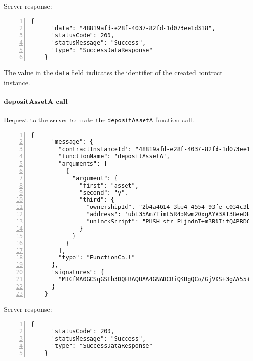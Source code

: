 Server response:
{
  \small
  \begin{Verbatim}[numbers=left,xleftmargin=1cm,firstnumber=1,breaklines=true,breakanywhere=true,tabsize=2]
    {
      "data": "48819afd-e28f-4037-82fd-1d073ee1d318",
      "statusCode": 200,
      "statusMessage": "Success",
      "type": "SuccessDataResponse"
    }
  \end{Verbatim}
}

The value in the \verb|data| field indicates the identifier of the created contract instance.

\paragraph{depositAssetA call}

Request to the server to make the \verb|depositAssetA| function call:
{
  \small
  \begin{Verbatim}[numbers=left,xleftmargin=1cm,firstnumber=1,breaklines=true,breakanywhere=true,tabsize=2]
    {
      "message": {
        "contractInstanceId": "48819afd-e28f-4037-82fd-1d073ee1d318",
        "functionName": "depositAssetA",
        "arguments": [
          {
            "argument": {
              "first": "asset",
              "second": "y",
              "third": {
                "ownershipId": "2b4a4614-3bb4-4554-93fe-c034c3ba5a9c",
                "address": "ubL35Am7TimL5R4oMwm2OxgAYA3XT3BeeDE56oxqdLc=",
                "unlockScript": "PUSH str PLjodnT+m3RNIitQAPBDCsRmJPHCqrwZOY/CPiHFZGnl+DRN6soqxMy3ehTFaUwxBjjf7qfBfvTDq5oBItTFrtz1Rn5SDS1ybdbkwpKaOXVglNOw7ZEG9bbZ1mo1oA7IAjRiIilzUetCstE5rPZIf9XOXr/RQ5AHkZUn2CztsvA=\nPUSH str MIGfMA0GCSqGSIb3DQEBAQUAA4GNADCBiQKBgQCo/GjVKS+3gAA55+kko41yINdOcCLQMSBQyuTTkKHE1mhu/TgOpivM0wLPsSga8hQMr3+v3aR0IF/vfCRf6SdiXmWx/jflmEXtnT6fkGcnV6dGNUpHWXSpwUIDt0N88jfnEqekx4S+KDCKg99sGEeHeT65fKS8lB0gjHMt9AOriwIDAQAB\n"
              }
            }
          }
        ],
        "type": "FunctionCall"
      },
      "signatures": {
        "MIGfMA0GCSqGSIb3DQEBAQUAA4GNADCBiQKBgQCo/GjVKS+3gAA55+kko41yINdOcCLQMSBQyuTTkKHE1mhu/TgOpivM0wLPsSga8hQMr3+v3aR0IF/vfCRf6SdiXmWx/jflmEXtnT6fkGcnV6dGNUpHWXSpwUIDt0N88jfnEqekx4S+KDCKg99sGEeHeT65fKS8lB0gjHMt9AOriwIDAQAB": "mo7rInHGBgsYK0igMBDbcWbRLHF93GnpKGj3NYttddc62CdS5yPg+S7XtHSULj50UCMQZRm3l5uPGtJySlaG31m8tV/JtpTSYNuZLOJdt8ViTMYzHPj0O3tI90R5VzZyyqBV7MkYmKkCK9jBAG3v0V1AqPD8wupXmXjzb5jWi1Q="
      }
    }
  \end{Verbatim}
}

\newpage
Server response:
{
  \small
  \begin{Verbatim}[numbers=left,xleftmargin=1cm,firstnumber=1,breaklines=true,breakanywhere=true,tabsize=2]
    {
      "statusCode": 200,
      "statusMessage": "Success",
      "type": "SuccessDataResponse"
    }
  \end{Verbatim}
}

